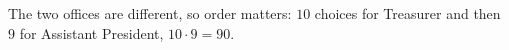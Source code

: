 The two offices are different, so order matters: $10$ choices for Treasurer and then $9$ for Assistant President, $10\cdot9=\boxed{90}$.
